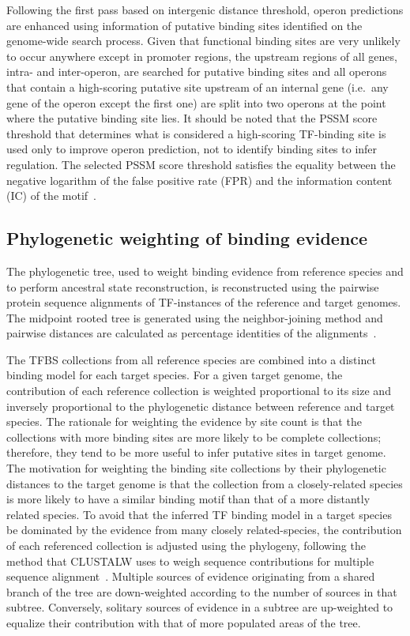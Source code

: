 Following the first pass based on intergenic distance threshold, operon
predictions are enhanced using information of putative binding sites identified
on the genome-wide search process. Given that functional binding sites are very
unlikely to occur anywhere except in promoter regions, the upstream regions of
all genes, intra- and inter-operon, are searched for putative binding sites and
all operons that contain a high-scoring putative site upstream of an internal
gene (i.e.\ any gene of the operon except the first one) are split into two
operons at the point where the putative binding site lies. It should be noted
that the PSSM score threshold that determines what is considered a high-scoring
TF-binding site is used only to improve operon prediction, not to identify
binding sites to infer regulation. The selected PSSM score threshold satisfies
the equality between the negative logarithm of the false positive rate (FPR)
and the information content (IC) of the motif~\citep{hertz1999identifying}.

\subsection{Phylogenetic weighting of binding evidence}

The phylogenetic tree, used to weight binding evidence from reference species
and to perform ancestral state reconstruction, is reconstructed using the
pairwise protein sequence alignments of TF-instances of the reference and target
genomes. The midpoint rooted tree is generated using the neighbor-joining
method and pairwise distances are calculated as percentage identities of the
alignments~\citep{saitou1987neighbor}.

The TFBS collections from all reference species are combined into a distinct
binding model for each target species. For a given target genome, the
contribution of each reference collection is weighted proportional to its size
and inversely proportional to the phylogenetic distance between reference and
target species. The rationale for weighting the evidence by site count is that
the collections with more binding sites are more likely to be complete
collections; therefore, they tend to be more useful to infer putative sites in
target genome. The motivation for weighting the binding site collections by
their phylogenetic distances to the target genome is that the collection from a
closely-related species is more likely to have a similar binding motif than
that of a more distantly related species. To avoid that the inferred TF binding
model in a target species be dominated by the evidence from many closely
related-species, the contribution of each referenced collection is adjusted
using the phylogeny, following the method that CLUSTALW uses to weigh sequence
contributions for multiple sequence
alignment~\citep{thompson1994clustal}. Multiple sources of evidence originating
from a shared branch of the tree are down-weighted according to the number of
sources in that subtree. Conversely, solitary sources of evidence in a subtree
are up-weighted to equalize their contribution with that of more populated
areas of the tree.


